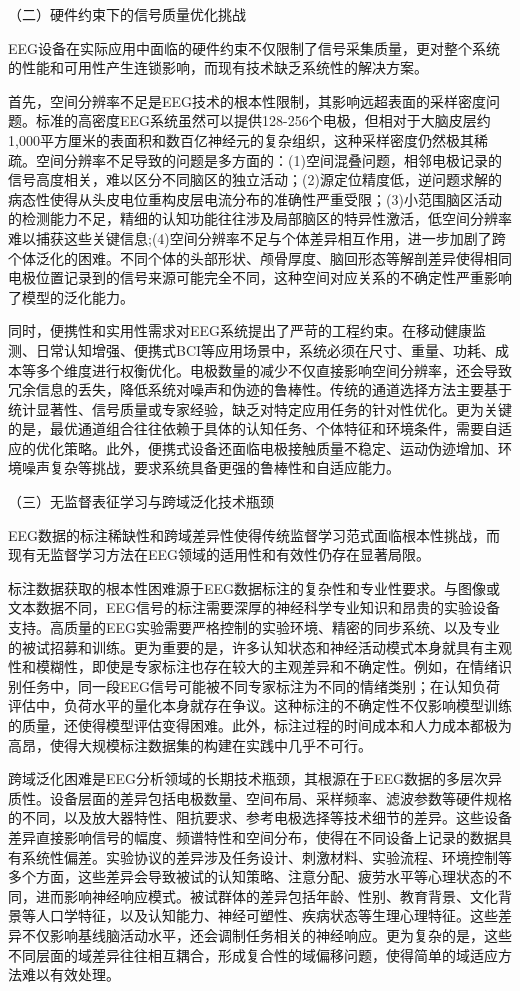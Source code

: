 （二）硬件约束下的信号质量优化挑战

EEG设备在实际应用中面临的硬件约束不仅限制了信号采集质量，更对整个系统的性能和可用性产生连锁影响，而现有技术缺乏系统性的解决方案。

首先，空间分辨率不足是EEG技术的根本性限制，其影响远超表面的采样密度问题。标准的高密度EEG系统虽然可以提供128-256个电极，但相对于大脑皮层约1,000平方厘米的表面积和数百亿神经元的复杂组织，这种采样密度仍然极其稀疏。空间分辨率不足导致的问题是多方面的：(1)空间混叠问题，相邻电极记录的信号高度相关，难以区分不同脑区的独立活动；(2)源定位精度低，逆问题求解的病态性使得从头皮电位重构皮层电流分布的准确性严重受限；(3)小范围脑区活动的检测能力不足，精细的认知功能往往涉及局部脑区的特异性激活，低空间分辨率难以捕获这些关键信息;(4)空间分辨率不足与个体差异相互作用，进一步加剧了跨个体泛化的困难。不同个体的头部形状、颅骨厚度、脑回形态等解剖差异使得相同电极位置记录到的信号来源可能完全不同，这种空间对应关系的不确定性严重影响了模型的泛化能力。

同时，便携性和实用性需求对EEG系统提出了严苛的工程约束。在移动健康监测、日常认知增强、便携式BCI等应用场景中，系统必须在尺寸、重量、功耗、成本等多个维度进行权衡优化。电极数量的减少不仅直接影响空间分辨率，还会导致冗余信息的丢失，降低系统对噪声和伪迹的鲁棒性。传统的通道选择方法主要基于统计显著性、信号质量或专家经验，缺乏对特定应用任务的针对性优化。更为关键的是，最优通道组合往往依赖于具体的认知任务、个体特征和环境条件，需要自适应的优化策略。此外，便携式设备还面临电极接触质量不稳定、运动伪迹增加、环境噪声复杂等挑战，要求系统具备更强的鲁棒性和自适应能力。


（三）无监督表征学习与跨域泛化技术瓶颈

EEG数据的标注稀缺性和跨域差异性使得传统监督学习范式面临根本性挑战，而现有无监督学习方法在EEG领域的适用性和有效性仍存在显著局限。

标注数据获取的根本性困难源于EEG数据标注的复杂性和专业性要求。与图像或文本数据不同，EEG信号的标注需要深厚的神经科学专业知识和昂贵的实验设备支持。高质量的EEG实验需要严格控制的实验环境、精密的同步系统、以及专业的被试招募和训练。更为重要的是，许多认知状态和神经活动模式本身就具有主观性和模糊性，即使是专家标注也存在较大的主观差异和不确定性。例如，在情绪识别任务中，同一段EEG信号可能被不同专家标注为不同的情绪类别；在认知负荷评估中，负荷水平的量化本身就存在争议。这种标注的不确定性不仅影响模型训练的质量，还使得模型评估变得困难。此外，标注过程的时间成本和人力成本都极为高昂，使得大规模标注数据集的构建在实践中几乎不可行。

跨域泛化困难是EEG分析领域的长期技术瓶颈，其根源在于EEG数据的多层次异质性。设备层面的差异包括电极数量、空间布局、采样频率、滤波参数等硬件规格的不同，以及放大器特性、阻抗要求、参考电极选择等技术细节的差异。这些设备差异直接影响信号的幅度、频谱特性和空间分布，使得在不同设备上记录的数据具有系统性偏差。实验协议的差异涉及任务设计、刺激材料、实验流程、环境控制等多个方面，这些差异会导致被试的认知策略、注意分配、疲劳水平等心理状态的不同，进而影响神经响应模式。被试群体的差异包括年龄、性别、教育背景、文化背景等人口学特征，以及认知能力、神经可塑性、疾病状态等生理心理特征。这些差异不仅影响基线脑活动水平，还会调制任务相关的神经响应。更为复杂的是，这些不同层面的域差异往往相互耦合，形成复合性的域偏移问题，使得简单的域适应方法难以有效处理。

